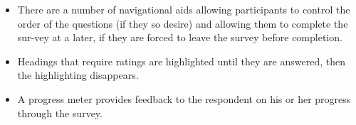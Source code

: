 \documentclass[a4,9pt]{beamer}
\begin{document}
\begin{frame}
\begin{itemize}
  \item There are a number of navigational aids allowing participants to control the order of the questions (if they so desire) and allowing them to complete the sur-vey at a later, if they are forced to leave the survey before completion.\\
  \item Headings that require ratings are highlighted until they are answered, then the highlighting disappears.\\
  \item A progress meter provides feedback to the respondent on his or her progress through the survey.\\
\end{itemize}
\end{frame}
\end{document}
